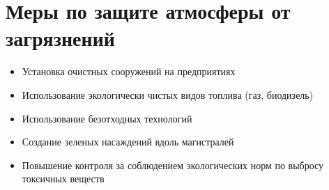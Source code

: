 
\section{Меры по защите атмосферы от загрязнений}
\begin{frame}{\insertsectionhead}
    \begin{itemize}
        \item Установка очистных сооружений на предприятиях
        \item Использование экологически чистых видов топлива (газ, биодизель)
        \item Использование безотходных технологий
        \item Создание зеленых насаждений вдоль магистралей
        \item Повышение контроля за соблюдением экологических норм 
            по выбросу токсичных веществ
    \end{itemize}
\end{frame}

